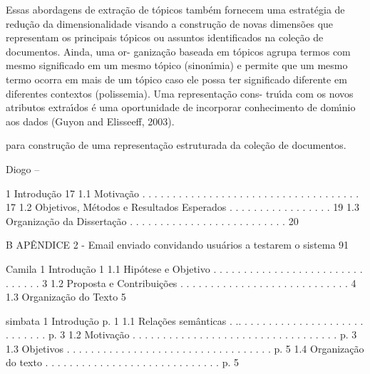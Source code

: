 Essas abordagens de extração de tópicos também fornecem uma estratégia
de redução da dimensionalidade visando a construção de novas dimensões que representam
os principais tópicos ou assuntos identificados na coleção de documentos. Ainda, uma or-
ganização baseada em tópicos agrupa termos com mesmo significado em um mesmo tópico
(sinonı́mia) e permite que um mesmo termo ocorra em mais de um tópico caso ele possa
ter significado diferente em diferentes contextos (polissemia). Uma representação cons-
truı́da com os novos atributos extraı́dos é uma oportunidade de incorporar conhecimento
de domı́nio aos dados (Guyon and Elisseeff, 2003).


para construção de uma representação estruturada da coleção de documentos.





























Diogo --

1 Introdução
17
1.1 Motivação . . . . . . . . . . . . . . . . . . . . . . . . . . . . . . . . . . . . 17
1.2 Objetivos, Métodos e Resultados Esperados . . . . . . . . . . . . . . . . . 19
1.3 Organização da Dissertação . . . . . . . . . . . . . . . . . . . . . . . . . . 20

B APÊNDICE 2 - Email enviado convidando usuários a testarem o sistema 91



Camila
1 Introdução
1
1.1 Hipótese e Objetivo . . . . . . . . . . . . . . . . . . . . . . . . . . . . . . . 3
1.2 Proposta e Contribuições . . . . . . . . . . . . . . . . . . . . . . . . . . . . 4
1.3 Organização do Texto 5


simbata
1
Introdução p. 1
1.1 Relações semânticas . .. . . . . . . . . . . . . . . . . . . . . . . . . . . . p. 3
1.2 Motivação . . . . . . .  . . . . . . . . . . . . . . . . . . . . . . . . . . . p. 3
1.3 Objetivos . . . . . . .  . . . . . . . . . . . . . . . . . . . . . . . . . . . p. 5
1.4 Organização do texto . . . . . . . . . . . . . . . . . . . . . . . . . . . . . p. 5






